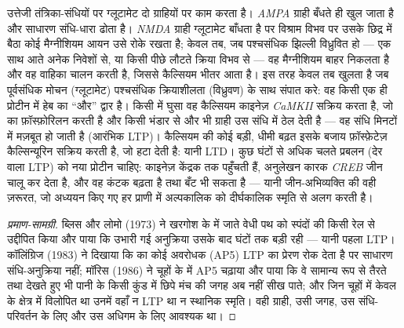 \begin{proposition}[संपात-संसूचक के रूप में NMDA ग्राही]\label{prop:b3:learning-memory:nmda}
उत्तेजी तंत्रिका-संधियों पर ग्लूटामेट दो ग्राहियों पर काम करता है।
\emph{AMPA} ग्राही बँधते ही खुल जाता है और साधारण संधि-धारा ढोता है।
\emph{NMDA} ग्राही ग्लूटामेट बाँधता है पर विश्राम विभव पर उसके छिद्र
में बैठा कोई मैग्नीशियम आयन उसे रोके रखता है; केवल तब, जब पश्चसंधिक
झिल्ली विध्रुवित हो --- एक साथ आते अनेक निवेशों से, या किसी पीछे लौटते
क्रिया विभव से --- वह मैग्नीशियम बाहर निकलता है और वह वाहिका चालन करती
है, जिससे कैल्सियम भीतर आता है। इस तरह  केवल तब खुलता है जब
पूर्वसंधिक मोचन (ग्लूटामेट) पश्चसंधिक क्रियाशीलता (विध्रुवण) के साथ
संपात करे: वह किसी एक ही प्रोटीन में हेब का ``और'' द्वार है। किसी
\emph{} में घुसा वह कैल्सियम काइनेज़ \emph{CaMKII} सक्रिय
करता है, जो  का फ़ॉस्फ़ोरिलन करती है और किसी भंडार से और
भी ग्राही उस संधि में ठेल देती है --- वह संधि मिनटों में मज़बूत हो जाती
है (आरंभिक LTP)। कैल्सियम की कोई बड़ी, धीमी बढ़त इसके बजाय
फ़ॉस्फ़ेटेज़ कैल्सिन्यूरिन सक्रिय करती है, जो  हटा देती है:
यानी LTD। कुछ घंटों से अधिक चलते प्रबलन (देर वाला LTP) को नया प्रोटीन
चाहिए: काइनेज़ केंद्रक तक पहुँचती हैं, अनुलेखन कारक \emph{CREB} जीन
चालू कर देता है, और वह कंटक बढ़ता है तथा बँट भी सकता है --- यानी
जीन-अभिव्यक्ति की वही ज़रूरत, जो अध्ययन किए गए हर प्राणी में
अल्पकालिक को दीर्घकालिक स्मृति से अलग करती है।
\end{proposition}

\begin{proof}[प्रमाण-सामग्री]
ब्लिस और लोमो (1973) ने खरगोश के  में जाते वेधी पथ को
स्पंदों की किसी रेल से उद्दीपित किया और पाया कि उभारी गई अनुक्रिया उसके
बाद घंटों तक बड़ी रही --- यानी पहला LTP। कॉलिंग्रिज (1983) ने दिखाया कि
 का कोई अवरोधक (AP5) LTP का प्रेरण रोक देता है पर साधारण
संधि-अनुक्रिया नहीं; मॉरिस (1986) ने चूहों के  में AP5
चढ़ाया और पाया कि वे सामान्य रूप से तैरते तथा देखते हुए भी पानी के किसी
कुंड में छिपे मंच की जगह अब नहीं सीख पाते; और जिन चूहों में 
केवल  के  क्षेत्र में विलोपित था उनमें वहाँ न LTP था न
स्थानिक स्मृति। वही ग्राही, उसी जगह, उस संधि-परिवर्तन के लिए और उस
अधिगम के लिए आवश्यक था।
\end{proof}

